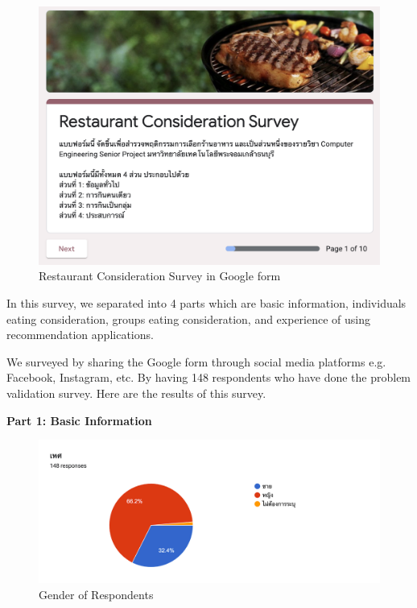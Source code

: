 \documentclass[12pt,oneside,openright,a4paper]{cpe-english-project}
\begin{document}
\begin{figure}[H]\centering
\includegraphics[width=350pt]{./images/A1RestaurantConsiderationSurveyinGoogleform.png}
\caption{Restaurant Consideration Survey in Google form}\label{fig:A1RestaurantConsiderationSurveyinGoogleform}
\end{figure}

In this survey, we separated into 4 parts which are basic information, individuals eating consideration, groups eating consideration, and experience of using recommendation applications.

We surveyed by sharing the Google form through social media platforms e.g. Facebook, Instagram, etc. By having 148 respondents who have done the problem validation survey. Here are the results of this survey.

\textbf{Part 1: Basic Information}

\begin{figure}[H]\centering
\includegraphics[width=350pt]{./images/A1GenderofRespondents.png}
\caption{Gender of Respondents}\label{fig:A1GenderofRespondents}
\end{figure}
\end{document}
